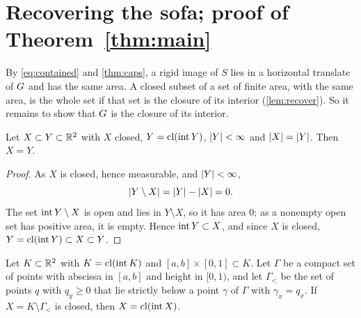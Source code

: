 \section{Recovering the sofa; proof of Theorem~\ref{thm:main}}\label{sec:recovery}

By \eqref{eq:contained} and \cref{thm:caps}, a rigid image of $S$ lies in a
horizontal translate of $G$ and has the same area. A closed subset of a set of
finite area, with the same area, is the whole set if that set is the closure of
its interior (\cref{lem:recover}). So it remains to show that $G$ is the
closure of its interior.

\begin{lemma}\label{lem:recover}
Let $X\subset Y\subset\mathbb{R}^2$ with $X$ closed, $Y=\operatorname{cl}(\operatorname{int} Y)$, $\lvert Y\rvert<\infty$ and $\lvert X\rvert=\lvert Y\rvert$. Then $X=Y$.
\end{lemma}

\begin{proof}
As $X$ is closed, hence measurable, and $\lvert Y\rvert<\infty$,
\[
  \lvert Y\setminus X\rvert=\lvert Y\rvert-\lvert X\rvert=0.
\]
The set $\operatorname{int} Y\setminus X$ is open and lies in
$Y\setminus X$, so it has area $0$; as a nonempty open set has positive area, it
is empty. Hence $\operatorname{int} Y\subset X$, and since $X$ is closed, $Y=\operatorname{cl}(\operatorname{int}
Y)\subset X\subset Y$.
\end{proof}

\begin{lemma}\label{lem:envelope}
Let $K\subset\mathbb{R}^2$ with $K=\operatorname{cl}(\operatorname{int} K)$ and $[a,b]\times[0,1]\subset K$. Let
$\Gamma$ be a compact set of points with abscissa in $[a,b]$ and height in
$[0,1)$, and let $\Gamma_<$ be the set of points $q$ with $q_y\ge0$ that lie
strictly below a point $\gamma$ of $\Gamma$ with $\gamma_x=q_x$. If
$X=K\setminus\Gamma_<$ is closed, then $X=\operatorname{cl}(\operatorname{int} X)$.
\end{lemma}

